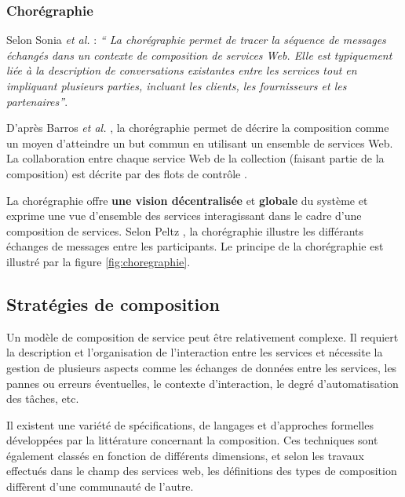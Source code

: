       \subsubsection{Chorégraphie}
      \label{sec:choregraphie-sec}
      Selon Sonia \emph{et al.} \cite{jamal2005environnement} :
      \emph{`` La chorégraphie permet de tracer la séquence de
        messages échangés dans un contexte de composition de services
        Web. Elle est typiquement liée à la description de
        conversations existantes entre les services tout en impliquant
        plusieurs parties, incluant les clients, les fournisseurs et
        les partenaires''}.

      D'après Barros \emph{et al.} \cite{barros2006standards}, la
      chorégraphie permet de décrire la composition comme un moyen
      d'atteindre un but commun en utilisant un ensemble de services
      Web. La collaboration entre chaque service Web de la collection
      (faisant partie de la composition) est décrite par des flots de
      contrôle \cite{lopez2008selection}.

      La chorégraphie offre \textbf{une vision décentralisée} et
      \textbf{globale} du système et exprime une vue d'ensemble des
      services interagissant dans le cadre d'une composition de
      services. Selon Peltz \cite{peltz2003web}, la chorégraphie
      illustre les différants échanges de messages entre les
      participants. Le principe de la chorégraphie est illustré par la
      figure \ref{fig:choregraphie}.

    \subsection{Stratégies de composition}
    \label{sec:types-de-composition}
    Un modèle de composition de service peut être relativement
    complexe. Il requiert la description et l'organisation de
    l'interaction entre les services et nécessite la gestion de
    plusieurs aspects comme les échanges de données entre les
    services, les pannes ou erreurs éventuelles, le contexte
    d'interaction, le degré d'automatisation des tâches, etc.
    
    Il existent une variété de spécifications, de langages et
    d'approches formelles développées par la littérature concernant la
    composition. Ces techniques sont également classés en fonction de
    différents dimensions, et selon les travaux effectués dans le
    champ des services web, les définitions des types de composition
    diffèrent d'une communauté de l'autre.
 
